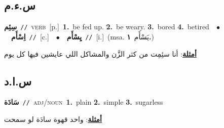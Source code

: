 \documentclass[10pt,a4paper,twoside]{article} %
\begin{document}
\begin{multicols}{2}
\vspace{-3mm}
\subsection*{\color{blue}\foreignlanguage{arabic}{س.ء.م}\color{blue}{}} 

{\setlength\topsep{0pt}\textbf{\foreignlanguage{arabic}{سِئِم}}\ {\color{gray}\texttt{//}\color{black}}\ \textsc{verb}\ [p.]\ \textbf{1.}~be fed up.  \textbf{2.}~be weary.  \textbf{3.}~bored  \textbf{4.}~betired\ \ $\bullet$\ \ \setlength\topsep{0pt}\textbf{\foreignlanguage{arabic}{اِسْأَم}}\ {\color{gray}\texttt{//}\color{black}}\ [c.]\ \ $\bullet$\ \ \setlength\topsep{0pt}\textbf{\foreignlanguage{arabic}{يِسْأَم}}\ {\color{gray}\texttt{//}\color{black}}\ [i.]\ \color{gray}(msa. \foreignlanguage{arabic}{يَسْأَم}~\foreignlanguage{arabic}{\textbf{١.}})\color{black}\  \begin{flushright}\color{gray}\foreignlanguage{arabic}{\textbf{\underline{\foreignlanguage{arabic}{أمثلة}}}: أنا سئِمِت من كثر الزَّن والمشاكل اللي عايشين فيها كل يوم}\end{flushright}\color{black}} \vspace{2mm}

\vspace{-3mm}
\subsection*{\color{blue}\foreignlanguage{arabic}{س.ا.د}\color{blue}{ (ntws)}} 

{\setlength\topsep{0pt}\textbf{\foreignlanguage{arabic}{سَادَة}}\ {\color{gray}\texttt{//}\color{black}}\ \textsc{adj/noun}\ \textbf{1.}~plain  \textbf{2.}~simple  \textbf{3.}~sugarless\  \begin{flushright}\color{gray}\foreignlanguage{arabic}{\textbf{\underline{\foreignlanguage{arabic}{أمثلة}}}: واحد قهوة سادَة لو سمحت}\end{flushright}\color{black}} \vspace{2mm}


\end{multicols}
\end{document}
